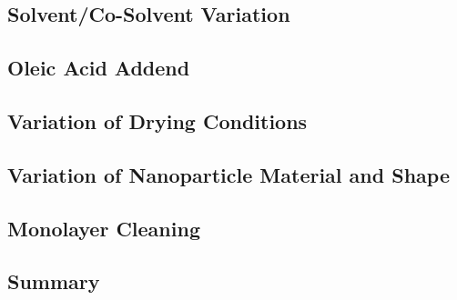 \documentclass[\main/dresen_thesis.tex]{subfiles}
\renewcommand{\thisPath}{\main/chapters/monolayers/preparationMonolayers}
\begin{document}

    \subsection{Solvent/Co-Solvent Variation}
      
      \FloatBarrier

    \subsection{Oleic Acid Addend}
      

    \subsection{Variation of Drying Conditions}
      

    \subsection{Variation of Nanoparticle Material and Shape}
      

    \subsection{Monolayer Cleaning}
      
      \FloatBarrier

    \subsection{Summary}
      
      \FloatBarrier
\end{document}
